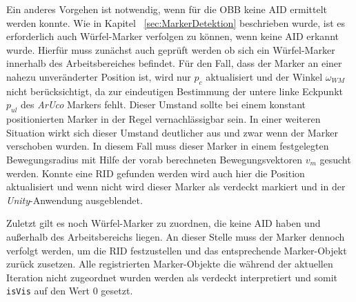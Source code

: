 Ein anderes Vorgehen ist notwendig, wenn für die OBB keine AID ermittelt werden konnte. Wie in Kapitel ~\ref{sec:MarkerDetektion} beschrieben wurde, ist es erforderlich auch Würfel-Marker verfolgen zu können, wenn keine AID erkannt wurde. Hierfür muss zunächst auch geprüft werden ob sich ein Würfel-Marker innerhalb des Arbeitsbereiches befindet. Für den Fall, dass der Marker an einer nahezu unveränderter Position ist, wird nur $p_c$  aktualisiert und der Winkel $\omega_{WM}$ nicht berücksichtigt, da zur eindeutigen Bestimmung der untere linke Eckpunkt $p_{ul}$ des \textit{ArUco} Markers fehlt. Dieser Umstand sollte bei einem konstant positionierten Marker in der Regel vernachlässigbar sein. In einer weiteren Situation wirkt sich dieser Umstand deutlicher aus und zwar wenn der Marker verschoben wurden. In diesem Fall muss dieser Marker in einem festgelegten Bewegungsradius mit Hilfe der vorab berechneten Bewegungsvektoren $v_m$ gesucht werden. Konnte eine RID gefunden werden wird auch hier die Position aktualisiert und wenn nicht wird dieser Marker als verdeckt markiert und in der \textit{Unity}-Anwendung ausgeblendet.

Zuletzt gilt es noch Würfel-Marker zu zuordnen, die keine AID haben und außerhalb des Arbeitsbereichs liegen. An dieser Stelle muss der Marker dennoch verfolgt werden, um die RID festzustellen und das entsprechende Marker-Objekt zurück zusetzen. Alle registrierten Marker-Objekte die während der aktuellen Iteration nicht zugeordnet wurden werden als verdeckt interpretiert und somit \texttt{isVis} auf den Wert $0$ gesetzt.

